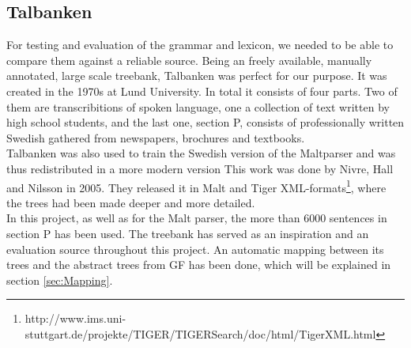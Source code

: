 \documentclass{report}
\begin{document}
%
%


\subsection{Talbanken}
For testing and evaluation of the grammar and lexicon, we needed to be able to
compare them against a reliable source.
Being an freely available, manually annotated, large scale treebank,
Talbanken\cite{talbanken} was perfect for our purpose.
It was created in the 1970s at Lund University. In total it consists of four
parts. Two of them are transcribitions of spoken language, one a collection of
text written by high school students, and the last one, section P,
consists of professionally written Swedish gathered from newspapers, brochures and textbooks.\\
Talbanken was also used to train the Swedish version of the Maltparser\cite{malt}
and was thus redistributed in a more modern version\cite{talbanken05} This work
was done by Nivre, Hall and Nilsson in 2005. They released it in Malt and Tiger
XML-formats\footnote{http://www.ims.uni-stuttgart.de/projekte/TIGER/TIGERSearch/doc/html/TigerXML.html},
where the trees had been made deeper and more detailed. \\
In this project, as well as for the Malt parser, the more than 6000 sentences
in section P has been used.
The treebank has served as an inspiration and an evaluation source throughout this
project. An automatic mapping between its trees and the abstract trees from GF has been
done, which will be explained in section \ref{sec:Mapping}.
\end{document}
